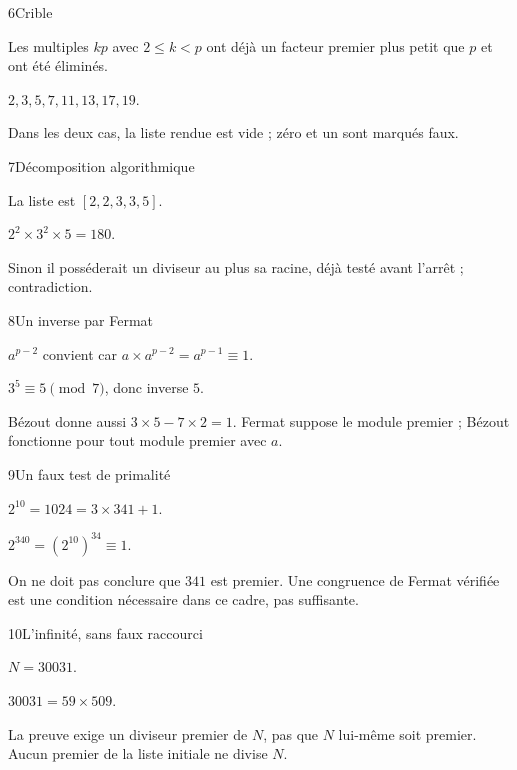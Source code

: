 \begin{corrige}{6}{Crible}
\begin{questions}
\item Les multiples $kp$ avec $2\leq k<p$ ont déjà un facteur premier plus petit que $p$ et ont été éliminés.
\item $2,3,5,7,11,13,17,19$.
\item Dans les deux cas, la liste rendue est vide ; zéro et un sont marqués faux.
\end{questions}
\end{corrige}
\begin{corrige}{7}{Décomposition algorithmique}
\begin{questions}
\item La liste est $[2,2,3,3,5]$.
\item $2^2\times3^2\times5=180$.
\item Sinon il posséderait un diviseur au plus sa racine, déjà testé avant l’arrêt ; contradiction.
\end{questions}
\end{corrige}
\begin{corrige}{8}{Un inverse par Fermat}
\begin{questions}
\item $a^{p-2}$ convient car $a\times a^{p-2}=a^{p-1}\equiv1$.
\item $3^5\equiv5\pmod7$, donc inverse $5$.
\item Bézout donne aussi $3\times5-7\times2=1$. Fermat suppose le module premier ; Bézout fonctionne pour tout module premier avec $a$.
\end{questions}
\end{corrige}
\begin{corrige}{9}{Un faux test de primalité}
\begin{questions}
\item $2^{10}=1024=3\times341+1$.
\item $2^{340}=(2^{10})^{34}\equiv1$.
\item On ne doit pas conclure que $341$ est premier. Une congruence de Fermat vérifiée est une condition nécessaire dans ce cadre, pas suffisante.
\end{questions}
\end{corrige}
\begin{corrige}{10}{L’infinité, sans faux raccourci}
\begin{questions}
\item $N=30031$.
\item $30031=59\times509$.
\item La preuve exige un diviseur premier de $N$, pas que $N$ lui-même soit premier. Aucun premier de la liste initiale ne divise $N$.
\end{questions}
\end{corrige}
